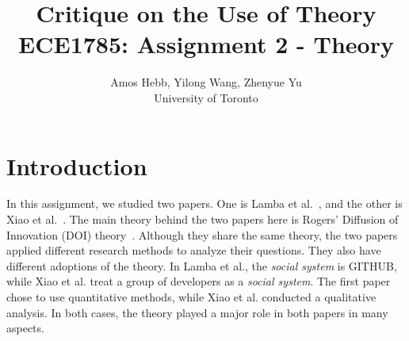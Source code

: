 \documentclass[journal,12pt,onecolumn,]{IEEEtran}
\begin{document}
\title{Critique on the Use of Theory\\
{\normalsize ECE1785: Assignment 2 - Theory}}

\author{Amos Hebb, Yilong Wang, Zhenyue Yu\\ \small University of Toronto}

\maketitle






\section{Introduction}

In this assignment, we studied two papers. One is Lamba et al.~\cite{lamba2020heard}, and the other is Xiao et al.~\cite{xiao2014social}. The main theory behind the two papers here is Rogers' Diffusion of Innovation (DOI) theory~\cite{rogers1995attributes}.
Although they share the same theory, the two papers applied different research methods to analyze their questions. They also have different adoptions of the theory. In Lamba et al., the \textit{social system} is GITHUB, while Xiao et al. treat a group of developers as a \textit{social system}.
The first paper chose to use quantitative methods, while Xiao et al. conducted a qualitative analysis. In both cases, the theory played a major role in both papers in many aspects.


\end{document}
